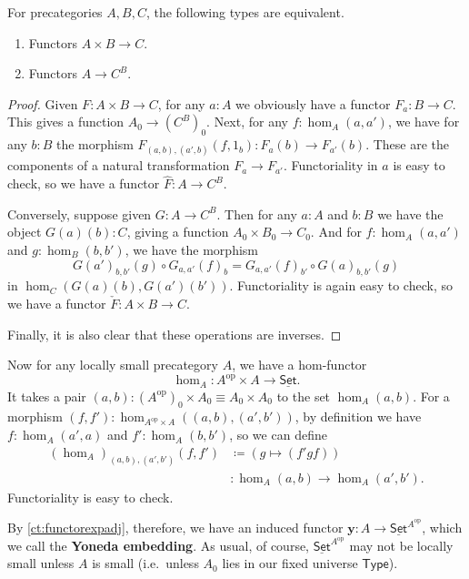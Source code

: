 \documentclass{mscs}
\newcommand{\jdeq}{\equiv}      %
\newcommand{\defeq}{\coloneqq}  %
\newcommand{\type}{\ensuremath{\mathsf{Type}}\xspace}
\renewcommand{\set}{\ensuremath{\mathsf{Set}}\xspace}
\newcommand{\uset}{\ensuremath{\underline{\set}}\xspace}
\numberwithin{equation}{section}
\newcommand{\op}{^{\textrm{op}}}
\newcommand{\y}{\ensuremath{\mathbf{y}}\xspace}
\begin{document}
\begin{lem}\label{ct:functorexpadj}
  For precategories $A,B,C$, the following types are equivalent.
  \begin{enumerate}
  \item Functors $A\times B\to C$.
  \item Functors $A\to C^B$.
  \end{enumerate}
\end{lem}
\begin{proof}
  Given $F:A\times B\to C$, for any $a:A$ we obviously have a functor $F_a : B\to C$.
  This gives a function $A_0 \to (C^B)_0$.
  Next, for any $f:\hom_A(a,a')$, we have for any $b:B$ the morphism $F_{(a,b),(a',b)}(f,1_b):F_a(b) \to F_{a'}(b)$.
  These are the components of a natural transformation $F_a \to F_{a'}$.
  Functoriality in $a$ is easy to check, so we have a functor $\widehat{F}:A\to C^B$.

  Conversely, suppose given $G:A\to C^B$.
  Then for any $a:A$ and $b:B$ we have the object $G(a)(b):C$, giving a function $A_0 \times B_0 \to C_0$.
  And for $f:\hom_A(a,a')$ and $g:\hom_B(b,b')$, we have the morphism
  \begin{equation*}
     G(a')_{b,b'}(g)\circ G_{a,a'}(f)_b = G_{a,a'}(f)_{b'} \circ  G(a)_{b,b'}(g)
  \end{equation*}
  in $\hom_C(G(a)(b), G(a')(b'))$.
  Functoriality is again easy to check, so we have a functor $\check{F}:A\times B \to C$.

  Finally, it is also clear that these operations are inverses.
\end{proof}

Now for any locally small precategory $A$, we have a hom-functor
\[\hom_A : A\op \times A \to \uset.\]
It takes a pair $(a,b): (A\op)_0 \times A_0 \jdeq A_0 \times A_0$ to the set $\hom_A(a,b)$.
For a morphism $(f,f') : \hom_{A\op\times A}((a,b),(a',b'))$, by definition we have $f:\hom_A(a',a)$ and $f':\hom_A(b,b')$, so we can define
\begin{align*}
  (\hom_A)_{(a,b),(a',b')}(f,f')
  &\defeq (g \mapsto (f'gf))\\
  &: \hom_A(a,b) \to \hom_A(a',b').
\end{align*}
Functoriality is easy to check.

By \autoref{ct:functorexpadj}, therefore, we have an induced functor $\y:A\to \uset^{A\op}$, which we call the \textbf{Yoneda embedding}.
As usual, of course, $\uset^{A\op}$ may not be locally small unless $A$ is small (i.e.\ unless $A_0$ lies in our fixed universe \type).
\end{document}
